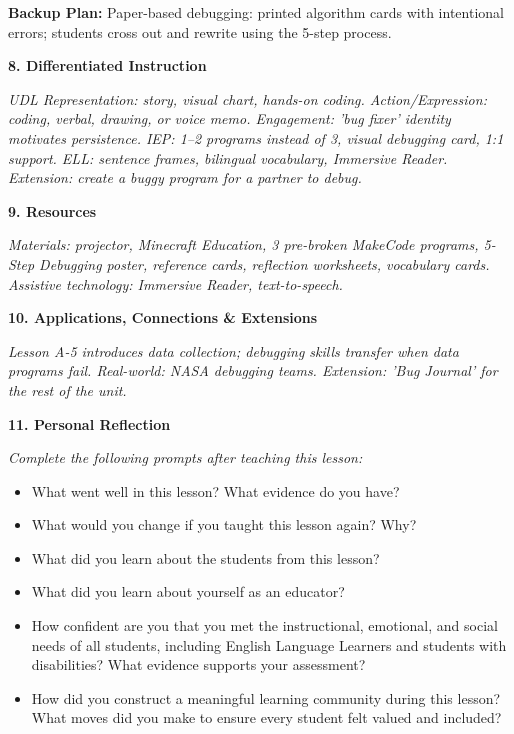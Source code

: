 \documentclass[11pt,letterpaper]{article}
\begin{document}
\textbf{Backup Plan: }Paper-based debugging: printed algorithm cards with intentional errors; students cross out and rewrite using the 5-step process.

\textbf{8. Differentiated Instruction}

\textit{UDL Representation: story, visual chart, hands-on coding. Action/Expression: coding, verbal, drawing, or voice memo. Engagement: 'bug fixer' identity motivates persistence. IEP: 1--2 programs instead of 3, visual debugging card, 1:1 support. ELL: sentence frames, bilingual vocabulary, Immersive Reader. Extension: create a buggy program for a partner to debug.}

\textbf{9. Resources}

\textit{Materials: projector, Minecraft Education, 3 pre-broken MakeCode programs, 5-Step Debugging poster, reference cards, reflection worksheets, vocabulary cards. Assistive technology: Immersive Reader, text-to-speech.}

\textbf{10. Applications, Connections \& Extensions}

\textit{Lesson A-5 introduces data collection; debugging skills transfer when data programs fail. Real-world: NASA debugging teams. Extension: 'Bug Journal' for the rest of the unit.}


\newpage
\textbf{11. Personal Reflection}

\textit{Complete the following prompts after teaching this lesson:}

\begin{itemize}
  \item What went well in this lesson? What evidence do you have?

  \item What would you change if you taught this lesson again? Why?

  \item What did you learn about the students from this lesson?

  \item What did you learn about yourself as an educator?

  \item How confident are you that you met the instructional, emotional, and social needs of all students, including English Language Learners and students with disabilities? What evidence supports your assessment?

  \item How did you construct a meaningful learning community during this lesson? What moves did you make to ensure every student felt valued and included?
\end{itemize}
\end{document}
